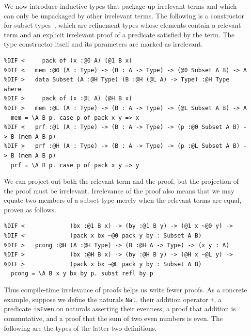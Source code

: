 \documentclass[acmsmall, screen=true, nonacm=true,
  review=\ifpublic false\else true\fi,
  anonymous=\ifanonymous true\else false\fi
]{acmart}
\providecommand{\DIFmodbegin}{} %
\providecommand{\DIFmodend}{} %
\begin{document}
We now introduce inductive types
that package up irrelevant terms
and which can only be unpackaged by other irrelevant terms.
The following is a constructor for subset types~\citep{constable:nuprl},
which are refinement types whose elements
contain a relevant term and an explicit irrelevant proof
of a predicate satisfied by the term.
The type constructor itself and its parameters are marked as irrelevant.

\DIFmodbegin
\begin{lstlisting}[alsolanguage=DIFcode]
%DIF <   data Subset (A :@1 Type) (B :@1 (@0 A) -> Type) :@1 Type where
%DIF <     pack of (x :@0 A) (@1 B x)
%DIF <   mem :@0 (A : Type) -> (B : A -> Type) -> (@0 Subset A B) -> A
%DIF >   data Subset (A :@H Type) (B :@H (@L A) -> Type) :@H Type where
%DIF >     pack of (x :@L A) (@H B x)
%DIF >   mem :@L (A : Type) -> (B : A -> Type) -> (@L Subset A B) -> A
  mem = \A B p. case p of pack x y => x
%DIF <   prf :@1 (A : Type) -> (B : A -> Type) -> (p :@0 Subset A B) -> B (mem A B p)
%DIF >   prf :@H (A : Type) -> (B : A -> Type) -> (p :@L Subset A B) -> B (mem A B p)
  prf = \A B p. case p of pack x y => y
\end{lstlisting}
\DIFmodend

We can project out both the relevant term and the proof,
but the projection of the proof must be irrelevant.
Irrelevance of the proof also means that we may equate
two members of a subset type merely when the relevant terms are equal,
proven as follows.

\DIFmodbegin
\begin{lstlisting}[alsolanguage=DIFcode]
%DIF <   pcong :@1 (A :@1 Type) -> (B :@1 A -> Type) -> (x y : A)
%DIF <             (bx :@1 B x) -> (by :@1 B y) -> (@1 x ~@0 y) ->
%DIF <             (pack x bx ~@0 pack y by : Subset A B)
%DIF >   pcong :@H (A :@H Type) -> (B :@H A -> Type) -> (x y : A)
%DIF >             (bx :@H B x) -> (by :@H B y) -> (@H x ~@L y) ->
%DIF >             (pack x bx ~@L pack y by : Subset A B)
  pcong = \A B x y bx by p. subst refl by p
\end{lstlisting}
\DIFmodend

Thus compile-time irrelevance of proofs helps us write fewer proofs.
As a concrete example, suppose we define the naturals \lstinline{Nat},
their addition operator \lstinline{+},
a predicate \lstinline{isEven} on naturals asserting their evenness,
a proof that addition is commutative,
and a proof that the sum of two even numbers is even.
The following are the types of the latter two definitions.
\end{document}
